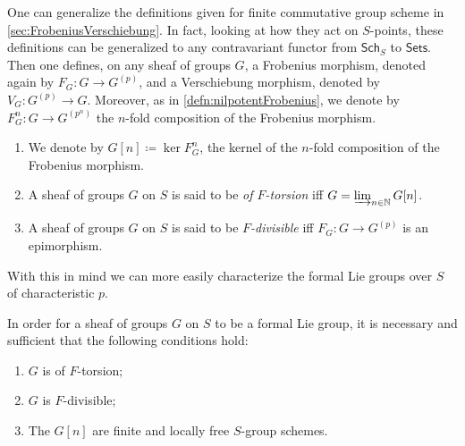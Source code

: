 \documentclass[../Main]{subfiles}
\begin{document}
\begin{rem}
One can generalize the definitions given for finite commutative group scheme
in \cref{sec:FrobeniusVerschiebung}.
In fact, looking at how they act on $S$-points, these
definitions can be generalized to any contravariant functor
from $\mathsf{Sch}_{ S }$ to $\mathsf{Sets}$.
Then one defines, on any sheaf of groups $G$, a Frobenius morphism,
denoted again by $F_G\colon G \to G^{(p)}$, 
and a Verschiebung morphism, denoted by $V_G \colon G^{(p)} \to G$.
Moreover, as in \cref{defn:nilpotentFrobenius}, we denote by
$F^n_G\colon G \to G^{(p^n)}$ the $n$-fold composition
of the Frobenius morphism.
\end{rem}


\begin{defn}[]\leavevmode\vspace{-.2\baselineskip}
\begin{enumerate}
\item We denote by $G[n] \coloneqq \ker F^n_G$, the kernel of the $n$-fold composition
	of the Frobenius morphism.

\item A sheaf of groups $G$ on $S$ is said to be {\em of $F$-torsion} iff
	$G = \varinjlim_{n \in \mathbb{N}} G[n]$.

\item A sheaf of groups $G$ on $S$ is said to be {\em $F$-divisible} iff
	$F_G\colon G \to G^{(p)}$ is an epimorphism.
\end{enumerate}
\end{defn}


\noindent
With this in mind we can more easily characterize the formal Lie groups over
$S$ of characteristic $p$.
\begin{thm}\label{thm:MessingCharactLieGroup}
	In order for a sheaf of groups $G$ on $S$ to be a formal Lie group,
	it is necessary and sufficient that the following conditions hold:
\begin{enumerate}
	\item $G$ is of $F$-torsion;
	\item $G$ is $F$-divisible;
	\item The $G[n]$ are finite and locally free $S$-group schemes.
\end{enumerate}
\end{thm}
\end{document}
